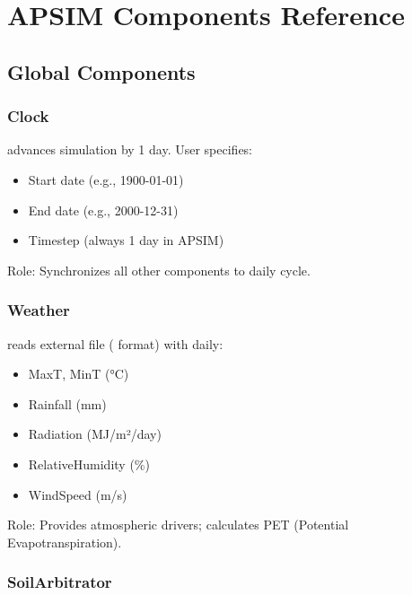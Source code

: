 
\chapter{APSIM Components Reference}
\label{app:components}

\section{Global Components}

\subsection{Clock}

 advances simulation by 1 day. User specifies:
\begin{itemize}
  \item Start date (e.g., 1900-01-01)
  \item End date (e.g., 2000-12-31)
  \item Timestep (always 1 day in APSIM)
\end{itemize}

Role: Synchronizes all other components to daily cycle.

\subsection{Weather}

 reads external file ( format) with daily:
\begin{itemize}
  \item MaxT, MinT (°C)
  \item Rainfall (mm)
  \item Radiation (MJ/m²/day)
  \item RelativeHumidity (\%)
  \item WindSpeed (m/s)
\end{itemize}

Role: Provides atmospheric drivers; calculates PET (Potential Evapotranspiration).

\subsection{SoilArbitrator}


